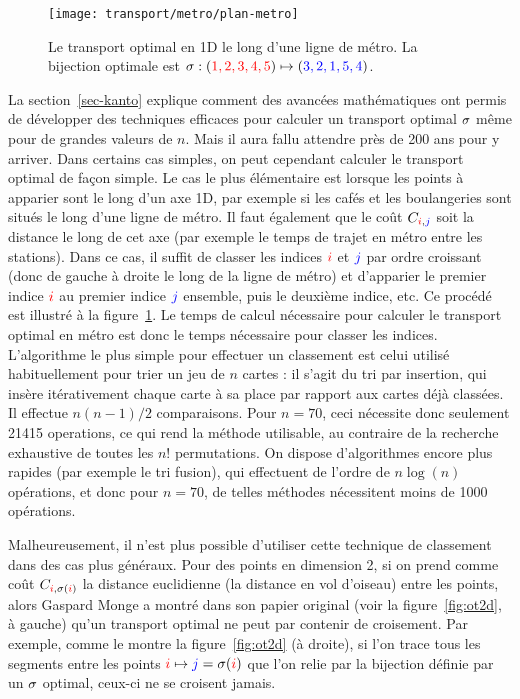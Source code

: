 \begin{figure}\centering
    \texttt{[image: transport/metro/plan-metro]}
    \caption{\label{fig:metro} Le transport optimal en 1D le long d'une ligne de métro. La bijection optimale est  
    $\sigma : ({\color{red}1,2,3,4,5}) \mapsto ({\color{blue}3,2,1,5,4})$. } 
\end{figure}


La section~\ref{sec-kanto} explique comment des avancées mathématiques ont permis de développer des techniques efficaces pour calculer un transport optimal $\sigma$ même pour de grandes valeurs de $n$. Mais il aura fallu attendre près de 200 ans pour y arriver. Dans certains cas simples, on peut cependant calculer le transport optimal de façon simple. Le cas le plus élémentaire est lorsque les points à apparier sont le long d'un axe 1D, par exemple si les cafés et les boulangeries sont situés le long d'une ligne de métro. Il faut également que le coût $C_{{\color{red}i},{\color{blue}j}}$ soit la distance le long de cet axe (par exemple le temps de trajet en métro entre les stations). Dans ce cas, il suffit de classer les indices ${\color{red}i}$ et ${\color{blue}j}$ par ordre croissant (donc de gauche à droite le long de la ligne de métro) et d'apparier le premier indice ${\color{red}i}$ au premier indice ${\color{blue}j}$ ensemble, puis le deuxième indice, etc. Ce procédé est illustré à la figure~\ref{fig:metro}.  Le temps de calcul nécessaire pour calculer le transport optimal en métro est donc le temps nécessaire pour classer les indices. L'algorithme le plus simple pour effectuer un classement est celui utilisé habituellement pour trier un jeu de $n$ cartes : il s'agit du tri par insertion, qui insère itérativement chaque carte à sa place par rapport aux cartes déjà classées. Il effectue $n(n-1)/2$ comparaisons. Pour $n=70$, ceci nécessite donc seulement 21415 operations, ce qui rend la méthode utilisable, au contraire de la recherche exhaustive de toutes les $n!$ permutations.
% 
On dispose d'algorithmes encore plus rapides (par exemple le tri fusion), qui effectuent de l'ordre de $n \log(n)$ opérations, et donc pour $n = 70$, de telles méthodes nécessitent moins de 1000 opérations. 

Malheureusement, il n'est plus possible d'utiliser cette technique de classement dans des cas plus généraux. Pour des points en dimension 2, si on prend comme coût $C_{{\color{red}i},\sigma({\color{red}i})}$ la distance euclidienne (la distance en vol d'oiseau) entre les points, alors Gaspard Monge a montré dans son papier original (voir la figure~\ref{fig:ot2d}, à gauche) qu'un transport optimal ne peut par contenir de croisement. Par exemple, comme le montre la figure~\ref{fig:ot2d} (à droite), si l'on trace tous les segments entre les points ${\color{red}i} \mapsto {\color{blue}j} = \sigma({\color{red}i})$  que l'on relie par la bijection définie par un $\sigma$ optimal, ceux-ci ne se croisent jamais. 

